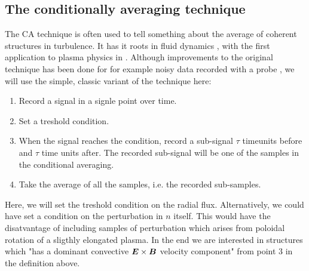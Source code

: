 \subsection{The conditionally averaging technique}
%
The CA technique is often used to tell something about the average of coherent structures in turbulence.
It has it roots in fluid dynamics \cite{Kovasznay1970}, with the first application to plasma physics in \cite{Huld1990}. Although improvements to the original technique has been done for for example noisy data recorded with a probe \cite{Teliban2007}, we will use the simple, classic variant of the technique here:
%
\begin{algorithm}
\begin{enumerate}
    \item Record a signal in a signle point over time.
    \item Set a treshold condition.
    \item When the signal reaches the condition, record a sub-signal $\tau$ timeunits before and $\tau$ time units after.
        The recorded sub-signal will be one of the samples in the conditional averaging.
    \item Take the average of all the samples, i.e. the recorded sub-samples.
\end{enumerate}
\end{algorithm}
%
Here, we will set the treshold condition on the radial flux.
Alternatively, we could have set a condition on the perturbation in $n$ itself.
This would have the disatvantage of including samples of perturbation which arises from poloidal rotation of a sligthly elongated plasma.
In the end we are interested in structures which "has a dominant convective $\boldsymbol{E}\times\boldsymbol{B}$ velocity component" from point $3$ in the definition above.

